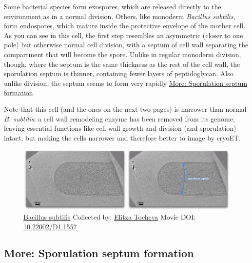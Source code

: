 \documentclass[]{tufte-book}
\begin{document}
Some bacterial species form exospores, which are released directly to
the environment as in a normal division. Others, like monoderm
\emph{Bacillus subtilis}, form endospores, which mature inside the
protective envelope of the mother cell. As you can see in this cell, the
first step resembles an asymmetric (closer to one pole) but otherwise
normal cell division, with a septum of cell wall separating the
compartment that will become the spore. Unlike in regular monoderm
division, though, where the septum is the same thickness as the rest of
the cell wall, the sporulation septum is thinner, containing fewer
layers of peptidoglycan. Also unlike division, the septum seems to form
very rapidly \protect\hyperlink{Sporulation_septum_formation}{More:
Sporulation septum formation}.

Note that this cell (and the ones on the next two pages) is narrower
than normal \emph{B. subtilis}; a cell wall remodeling enzyme has been
removed from its genome, leaving essential functions like cell wall
growth and division (and sporulation) intact, but making the cells
narrower and therefore better to image by cryoET.





\begin{figure}
\includegraphics{movie_stills/8_5} \caption[\protect\hyperlink{tree}{Bacillus subtilis} Collected by:
\protect\hyperlink{elitza_tocheva}{Elitza Tocheva} Movie DOI:
\href{https://doi.org/10.22002/D1.1557}{10.22002/D1.1557}]{\protect\hyperlink{tree}{Bacillus subtilis} Collected by:
\protect\hyperlink{elitza_tocheva}{Elitza Tocheva} Movie DOI:
\href{https://doi.org/10.22002/D1.1557}{10.22002/D1.1557}}\label{fig:8-5}
\end{figure}

\hypertarget{Sporulation_septum_formation}{\subsection*{More:
Sporulation septum formation}\label{Sporulation_septum_formation}}
\end{document}
